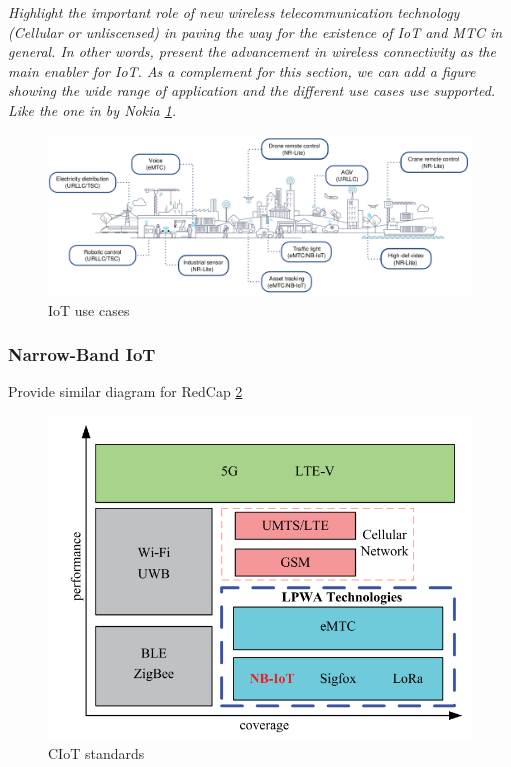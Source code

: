 \documentclass[conference]{IEEEtran}
\begin{document}
\textit{Highlight the important role of new wireless telecommunication technology (Cellular or unliscensed) in paving the way for the existence of IoT and MTC in general. In other words, present the advancement in wireless connectivity as the main enabler for IoT. As a complement for this section, we can add a figure showing the wide range of application and the different use cases  use supported. Like the one in by Nokia \ref{fig:iot-use-cases}.}

\begin{figure}
    \centering
    \includegraphics[width=\linewidth]{Pictures/IoT Use Cases.png}
    \caption{IoT use cases}
    \label{fig:iot-use-cases}
\end{figure}


\subsubsection{Narrow-Band IoT}
\label{sec:1-1-1}

Provide similar diagram for RedCap \ref{fig:nb-iot}
\begin{figure}
    \centering
    \includegraphics[width=\linewidth]{Pictures/NB-IoT example.png}
    \caption{CIoT standards}
    \label{fig:nb-iot}
\end{figure}
\end{document}
